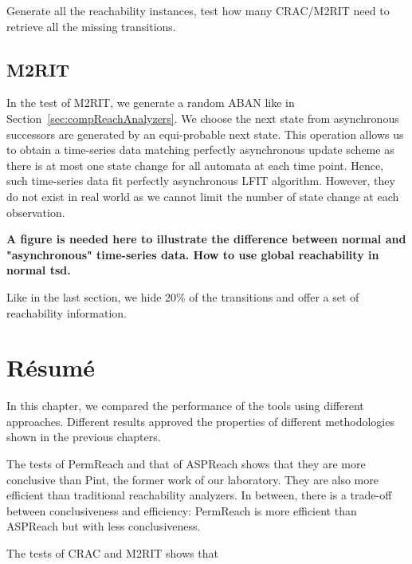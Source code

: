 Generate all the reachability instances, test how many CRAC/M2RIT need to retrieve all the missing transitions.

\subsection{M2RIT}
In the test of M2RIT, we generate a random ABAN like in Section~\ref{sec:compReachAnalyzers}.
We choose the next state from asynchronous successors are generated by an equi-probable next state.
This operation allows us to obtain a time-series data matching perfectly asynchronous update scheme as there is at most one state change for all automata at each time point. 
Hence, such time-series data fit perfectly asynchronous LFIT algorithm.
However, they do not exist in real world as we cannot limit the number of state change at each observation.

\textbf{A figure is needed here to illustrate the difference between normal and "asynchronous" time-series data.
How to use global reachability in normal tsd.}

Like in the last section, we hide 20\% of the transitions and offer a set of reachability information.


\section{R\'esum\'e}

In this chapter, we compared the performance of the tools using different approaches.
Different results approved the properties of different methodologies shown in the previous chapters.

The tests of PermReach and that of ASPReach shows that they are more conclusive than Pint, the former work of our laboratory.
They are also more efficient than traditional reachability analyzers.
In between, there is a trade-off between conclusiveness and efficiency: 
PermReach is more efficient than ASPReach but with less conclusiveness.

The tests of CRAC and M2RIT shows that 
